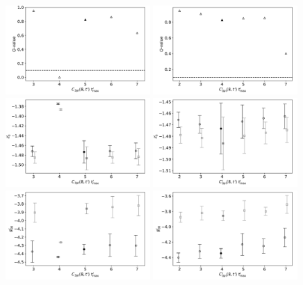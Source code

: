 \documentclass[prd,aps,twocolumn,superscriptaddress,tightenlines,nofootinbib,floatfix,preprintnumbers,10pt]{revtex4-1}
\begin{document}
\newpage
\begin{figure}[h]{
		\includegraphics[width=0.49\textwidth]{plots/figures/3296_gV8_tmax_Q.pdf}
		\includegraphics[width=0.49\textwidth]{plots/figures/3296_dgV8_tmax_Q.pdf}
		\includegraphics[width=0.49\textwidth]{plots/figures/3296_gV8_tmax_dZ0.pdf}
		\includegraphics[width=0.49\textwidth]{plots/figures/3296_dgV8_tmax_dZ0.pdf}
		\includegraphics[width=0.49\textwidth]{plots/figures/3296_gV8_tmax_dgV.pdf}
		\includegraphics[width=0.49\textwidth]{plots/figures/3296_dgV8_tmax_dgV.pdf}
}
\end{figure}
\end{document}
